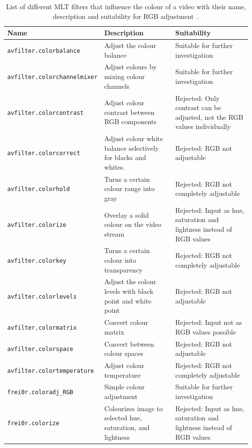 \documentclass[../MasterThesis.tex]{subfiles}
\begin{document}
\begin{table}[H]
	\footnotesize
	\begin{tabular}{lp{4.4cm}p{4.5cm}}
	\toprule
	Name & Description & Suitability \\ 
	\midrule
	
	\texttt{avfilter.colorbalance} & Adjust the colour balance & Suitable for further investigation \\ 
	
	\texttt{avfilter.colorchannelmixer} & Adjust colours by mixing colour channels & Suitable for further investigation \\ 
	
	\texttt{avfilter.colorcontrast} & Adjust colour contrast between RGB components & Rejected: Only contrast can be adjusted, not the RGB values individually \\ 
	
	\texttt{avfilter.colorcorrect} & Adjust colour white balance selectively for blacks and whites. & Rejected: RGB not adjustable \\ 
	
	\texttt{avfilter.colorhold} & Turns a certain colour range into gray & Rejected: RGB not completely adjustable \\ 
	
	\texttt{avfilter.colorize} & Overlay a solid colour on the video stream & Rejected: Input as hue, saturation and lightness instead of RGB values \\ 
	
	\texttt{avfilter.colorkey} & Turns a certain colour into transparency & Rejected: RGB not completely adjustable \\ 
	
	\texttt{avfilter.colorlevels} & Adjust the colour levels with black point and white point & Rejected: RGB not adjustable \\ 
	
	\texttt{avfilter.colormatrix} & Convert colour matrix & Rejected: Input not as RGB values possible \\ 
	
	\texttt{avfilter.colorspace} & Convert between colour spaces & Rejected: RGB not adjustable \\ 
	
	\texttt{avfilter.colortemperature} & Adjust colour temperature & Rejected: RGB not completely adjustable \\
	
	\texttt{frei0r.coloradj\_RGB} & Simple colour adjustment & Suitable for further investigation \\ 
	
	\texttt{frei0r.colorize} & Colourizes image to selected hue, saturation, and lightness & Rejected: Input as hue, saturation and lightness instead of RGB values \\ 
	\bottomrule
	\end{tabular}
	\caption[List of MLT filters that influence the colour of a video.]{List of different MLT filters that influence the colour of a video with their name, description and suitability for RGB adjustment~\cite{melt_filters}.}
	\label{table:many_filters}
\end{table}
\end{document}
